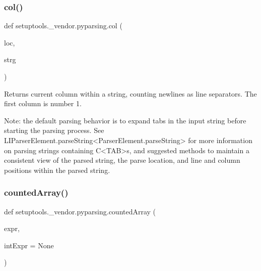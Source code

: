 \subsubsection{\texorpdfstring{col()}{col()}}
{\footnotesize\ttfamily def setuptools.\+\_\+vendor.\+pyparsing.\+col (\begin{DoxyParamCaption}\item[{}]{loc,  }\item[{}]{strg }\end{DoxyParamCaption})}

\begin{DoxyVerb}Returns current column within a string, counting newlines as line separators.
   The first column is number 1.

   Note: the default parsing behavior is to expand tabs in the input string
   before starting the parsing process.  See L{I{ParserElement.parseString}<ParserElement.parseString>} for more information
   on parsing strings containing C{<TAB>}s, and suggested methods to maintain a
   consistent view of the parsed string, the parse location, and line and column
   positions within the parsed string.\end{DoxyVerb}
 \mbox{\label{namespacesetuptools_1_1__vendor_1_1pyparsing_a67bb1324811cd2d127f551efcefa1333}} 
\subsubsection{\texorpdfstring{counted\+Array()}{countedArray()}}
{\footnotesize\ttfamily def setuptools.\+\_\+vendor.\+pyparsing.\+counted\+Array (\begin{DoxyParamCaption}\item[{}]{expr,  }\item[{}]{int\+Expr = {\ttfamily None} }\end{DoxyParamCaption})}

